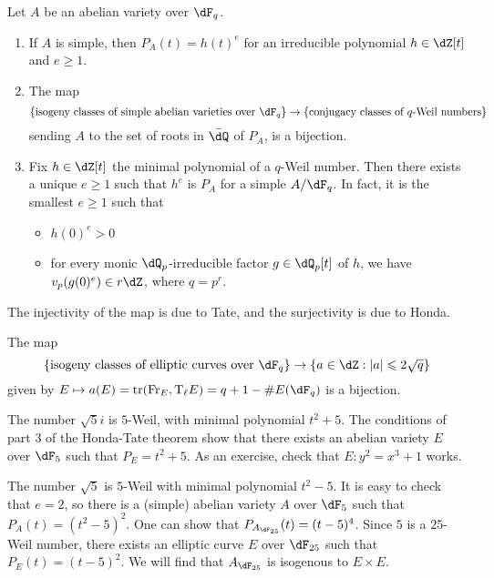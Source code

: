 \begin{theorem}
Let $A$ be an abelian variety over $\dF_q$. 
\begin{enumerate}
  \item If $A$ is simple, then $P_A(t) = h(t)^e$ for an irreducible polynomial 
    $h\in \dZ[t]$ and $e\geqslant 1$.
  \item The map 
    \[
      \{\text{isogeny classes of simple abelian varieties over $\dF_q$}\} \to \{\text{conjugacy classes of $q$-Weil numbers}\}
    \]
    sending $A$ to the set of roots in $\bar\dQ$ of $P_A$, is a bijection. 
  \item Fix $h\in \dZ[t]$ the minimal polynomial of a $q$-Weil number. Then 
    there exists a unique $e\geqslant 1$ such that $h^e$ is $P_A$ for a simple 
    $A/\dF_q$. In fact, it is the smallest $e\geqslant 1$ such that 
    \begin{itemize}
      \item $h(0)^e>0$ 
      \item for every monic $\dQ_p$-irreducible factor $g\in \dQ_p[t]$ of $h$, 
        we have $v_p(g(0)^e)\in r\dZ$, where $q=p^r$. 
     \end{itemize}
\end{enumerate}
\end{theorem}

The injectivity of the map is due to Tate, and the surjectivity is due to 
Honda. 

\begin{corollary}
The map 
\[
  \{\text{isogeny classes of elliptic curves over $\dF_q$}\} \to \{a\in \dZ:|a|\leqslant 2\sqrt q\}
\]
given by $E\mapsto a(E)=\trace(\geomfrob_E,\tate_\ell E) = q+1-\# E(\dF_q)$ is a bijection. 
\end{corollary}

\begin{example}
The number $\sqrt 5 i$ is $5$-Weil, with minimal polynomial $t^2+5$. The 
conditions of part 3 of the Honda-Tate theorem show that there exists an 
abelian variety $E$ over $\dF_5$ such that $P_E=t^2+5$. As an exercise, check 
that $E:y^2=x^3+1$ works. 
\end{example}

\begin{example}
The number $\sqrt 5$ is $5$-Weil with minimal polynomial $t^2-5$. It is easy to 
check that $e=2$, so there is a (simple) abelian variety $A$ over $\dF_5$ such 
that $P_A(t) = (t^2-5)^2$. One can show that $P_{A_{\dF_{25}}}(t) = (t-5)^4$. 
Since $5$ is a $25$-Weil number, there exists an elliptic curve $E$ over 
$\dF_{25}$ such that $P_E(t)=(t-5)^2$. We will find that $A_{\dF_{25}}$ is 
isogenous to $E\times E$. 
\end{example}





